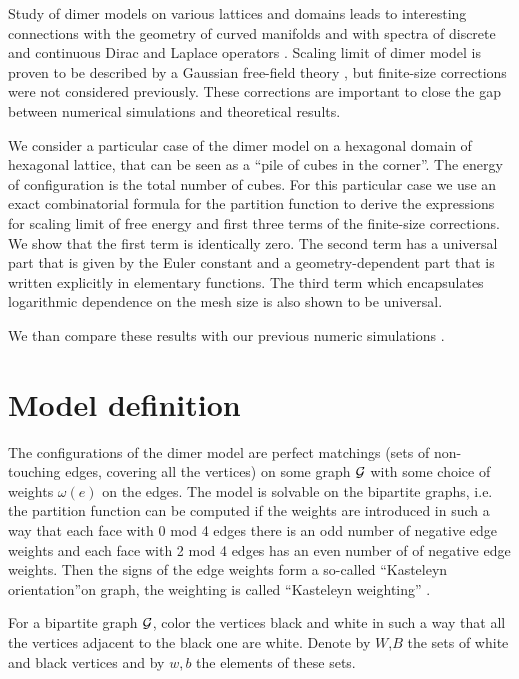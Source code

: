 \documentclass{article}
\begin{document}
Study of dimer models on various lattices and domains leads to interesting connections with the
geometry of curved manifolds and with spectra of discrete and continuous Dirac and Laplace operators
\cite{kenyon2002laplacian,kenyon2000asymptotic}. Scaling limit of dimer model is proven to be
described by a Gaussian free-field theory \cite{kenyon2001dominos}, but finite-size corrections were
not considered previously. These corrections are important to close the gap between numerical
simulations and theoretical results.

We consider a particular case of the dimer model on a hexagonal domain of hexagonal lattice, that
can be seen as a ``pile of cubes in the corner''. The energy of configuration is the total number of
cubes. For this particular case we use an exact combinatorial formula for the partition function to
derive the expressions for scaling limit of free energy and first three terms of the finite-size
corrections. We show that the first term is identically zero. The second term has a universal part
that is given by the Euler constant and a geometry-dependent part that is written explicitly in
elementary functions. The third term which encapsulates logarithmic dependence on the mesh size is
also shown to be universal.

We than compare these results with our previous numeric simulations \cite{belov2018finite}. 
\section{Model definition}
\label{sec:model-definition}
The configurations of the dimer model are perfect matchings (sets of non-touching edges, covering
all the vertices) on some graph ${\cal G}$ with some choice of weights $\omega(e)$ on the edges. The
model is solvable on the bipartite graphs, i.e. the partition function can be computed if the
weights are introduced in such a way that each face with 0 mod 4 edges there is an odd number of
negative edge weights and each face with 2 mod 4 edges has an even number of of negative edge
weights. Then the signs of the edge weights form a so-called ``Kasteleyn orientation''on graph, the
weighting is called ``Kasteleyn weighting'' \cite{kenyon2001dominos,kenyon2009lectures}.

For a bipartite graph ${\cal G}$, color the vertices black and white in such a way that all the
vertices adjacent to the black one are white. Denote by $W$,$B$ the sets of white and black
vertices and by $w,b$ the elements of these sets. 
\end{document}
